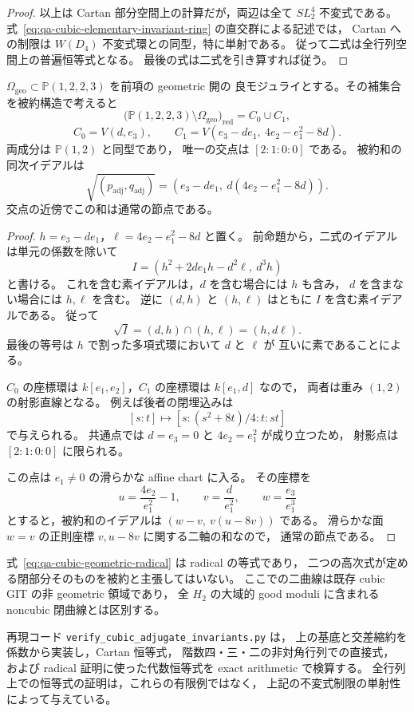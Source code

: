 \begin{proof}
以上は Cartan 部分空間上の計算だが，両辺は全て $SL_2^4$ 不変式である。
式~\eqref{eq:qa-cubic-elementary-invariant-ring} の直交群による記述では，
Cartan への制限は $W(D_4)$ 不変式環との同型，特に単射である。
従って二式は全行列空間上の普遍恒等式となる。
最後の式は二式を引き算すれば従う。
\end{proof}

\begin{corollary}[Geometric開の被約補集合]
\label{cor:qa-cubic-geometric-two-complement-curves}
$\Omega_{\mathrm{geo}}\subset\mathbb P(1,2,2,3)$ を前項の geometric 開の
良モジュライとする。その補集合を被約構造で考えると
\[
 \bigl(\mathbb P(1,2,2,3)\setminus\Omega_{\mathrm{geo}}\bigr)_{\mathrm{red}}
    =C_0\cup C_1,
\]
\[
 C_0=V(d,e_3),\qquad
 C_1=V(e_3-de_1,\ 4e_2-e_1^2-8d).
 \tag{CC}\label{eq:qa-cubic-two-bad-curves}
\]
両成分は $\mathbb P(1,2)$ と同型であり，
唯一の交点は $[2:1:0:0]$ である。
被約和の同次イデアルは
\[
 \sqrt{(p_{\mathrm{adj}},q_{\mathrm{adj}})}
 =
 (e_3-de_1,\ d(4e_2-e_1^2-8d)).
 \tag{CR}\label{eq:qa-cubic-geometric-radical}
\]
交点の近傍でこの和は通常の節点である。
\end{corollary}
\begin{proof}
$h=e_3-de_1$，$\ell=4e_2-e_1^2-8d$ と置く。
前命題から，二式のイデアルは単元の係数を除いて
\[
 I=(h^2+2de_1h-d^2\ell,\ d^3h)
\]
と書ける。
これを含む素イデアルは，$d$ を含む場合には $h$ も含み，
$d$ を含まない場合には $h,\ell$ を含む。
逆に $(d,h)$ と $(h,\ell)$ はともに $I$ を含む素イデアルである。
従って
\[
 \sqrt I=(d,h)\cap(h,\ell)=(h,d\ell).
\]
最後の等号は $h$ で割った多項式環において $d$ と $\ell$ が
互いに素であることによる。

$C_0$ の座標環は $k[e_1,e_2]$，$C_1$ の座標環は $k[e_1,d]$ なので，
両者は重み $(1,2)$ の射影直線となる。
例えば後者の閉埋込みは
\[
 [s:t]\longmapsto
 [s:(s^2+8t)/4:t:st]
\]
で与えられる。
共通点では $d=e_3=0$ と $4e_2=e_1^2$ が成り立つため，
射影点は $[2:1:0:0]$ に限られる。

この点は $e_1\ne0$ の滑らかな affine chart に入る。
その座標を
\[
 u=\frac{4e_2}{e_1^2}-1,\qquad
 v=\frac d{e_1^2},\qquad
 w=\frac{e_3}{e_1^3}
\]
とすると，被約和のイデアルは $(w-v,\ v(u-8v))$ である。
滑らかな面 $w=v$ の正則座標 $v,u-8v$ に関する二軸の和なので，
通常の節点である。
\end{proof}

\begin{remark}[被約補集合と検算の範囲]
式~\eqref{eq:qa-cubic-geometric-radical} は radical の等式であり，
二つの高次式が定める閉部分そのものを被約と主張してはいない。
ここでの二曲線は既存 cubic GIT の非 geometric 領域であり，
全 $H_2$ の大域的 good moduli に含まれる noncubic 閉曲線とは区別する。

再現コード \texttt{verify\_cubic\_adjugate\_invariants.py} は，
上の基底と交差縮約を係数から実装し，Cartan 恒等式，
階数四・三・二の非対角行列での直接式，
および radical 証明に使った代数恒等式を exact arithmetic で検算する。
全行列上での恒等式の証明は，これらの有限例ではなく，
上記の不変式制限の単射性によって与えている。
\end{remark}

